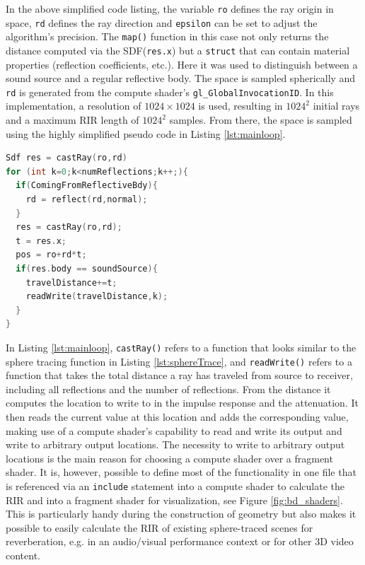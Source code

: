 \documentclass[twoside,a4paper]{article}
\begin{document}
In the above simplified code listing, the variable \texttt{ro} defines the ray origin in space, \texttt{rd} defines the ray direction and \texttt{epsilon} can be set to adjust the algorithm's precision. The \texttt{map()} function in this case not only returns the distance computed via the SDF(\texttt{res.x}) but a \texttt{struct} that can contain material properties (reflection coefficients, etc.). Here it was used to distinguish between a sound source and a regular reflective body.
The space is sampled spherically and \texttt{rd} is generated from the compute shader's \texttt{gl\_GlobalInvocationID}. In this implementation, a resolution of $1024 \times 1024$ is used, resulting in $1024^2$ initial rays and a maximum RIR length of $1024^2$ samples.
From there, the space is sampled using the highly simplified pseudo code in Listing \ref{lst:mainloop}.




\begin{lstlisting}[float,floatplacement=H, language=C, caption={\it GLSL pseudo code for sampling the space and writing to the RIR.},captionpos=b, label=lst:mainloop]
Sdf res = castRay(ro,rd)
for (int k=0;k<numReflections;k++;){
  if(ComingFromReflectiveBdy){
    rd = reflect(rd,normal);
  }
  res = castRay(ro,rd);
  t = res.x;
  pos = ro+rd*t;
  if(res.body == soundSource){
    travelDistance+=t;
    readWrite(travelDistance,k);
  }
}

\end{lstlisting}

In Listing \ref{lst:mainloop}, \texttt{castRay()} refers to a function that looks similar to the sphere tracing function in Listing \ref{lst:sphereTrace}, and \texttt{readWrite()} refers to a function that takes the total distance a ray has traveled from source to receiver, including all reflections and the number of reflections. From the distance it computes the location to write to in the impulse response and the attenuation. It then reads the current value at this location and adds the corresponding value, making use of a compute shader's capability to read and write its output and write to arbitrary output locations. The necessity to write to arbitrary output locations is the main reason for choosing a compute shader over a fragment shader. It is, however, possible to define most of the functionality in one file that is referenced via an \texttt{include} statement into a compute shader to calculate the RIR and into a fragment shader for visualization, see Figure \ref{fig:bd_shaders}. This is particularly handy during the construction of geometry but also makes it possible to easily calculate the RIR of existing sphere-traced scenes for reverberation, e.g. in an audio/visual performance context or for other 3D video content.
\end{document}

